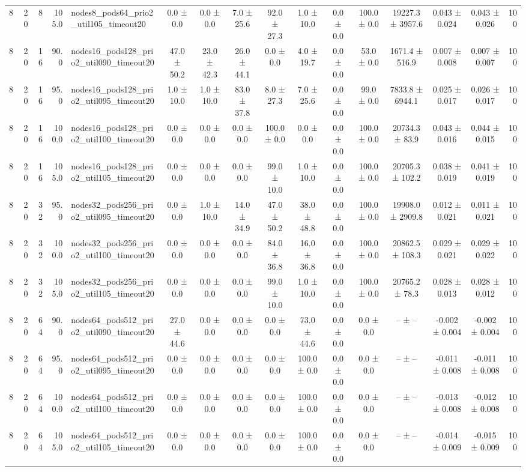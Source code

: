 \begin{tabular}{r r r r l c c c c c c c c c c r}
8 & 20 & 8 & 105.0 & nodes8\_pods64\_prio2\_util105\_timeout20 & 0.0 ± 0.0 & 0.0 ± 0.0 & 7.0 ± 25.6 & 92.0 ± 27.3 & 1.0 ± 10.0 & 0.0 ± 0.0 & 100.0 ± 0.0 & 19227.3 ± 3957.6 & 0.043 ± 0.024 & 0.043 ± 0.026 & 100 \\
8 & 20 & 16 & 90.0 & nodes16\_pods128\_prio2\_util090\_timeout20 & 47.0 ± 50.2 & 23.0 ± 42.3 & 26.0 ± 44.1 & 0.0 ± 0.0 & 4.0 ± 19.7 & 0.0 ± 0.0 & 53.0 ± 0.0 & 1671.4 ± 516.9 & 0.007 ± 0.008 & 0.007 ± 0.007 & 100 \\
8 & 20 & 16 & 95.0 & nodes16\_pods128\_prio2\_util095\_timeout20 & 1.0 ± 10.0 & 1.0 ± 10.0 & 83.0 ± 37.8 & 8.0 ± 27.3 & 7.0 ± 25.6 & 0.0 ± 0.0 & 99.0 ± 0.0 & 7833.8 ± 6944.1 & 0.025 ± 0.017 & 0.026 ± 0.017 & 100 \\
8 & 20 & 16 & 100.0 & nodes16\_pods128\_prio2\_util100\_timeout20 & 0.0 ± 0.0 & 0.0 ± 0.0 & 0.0 ± 0.0 & 100.0 ± 0.0 & 0.0 ± 0.0 & 0.0 ± 0.0 & 100.0 ± 0.0 & 20734.3 ± 83.9 & 0.043 ± 0.016 & 0.044 ± 0.015 & 100 \\
8 & 20 & 16 & 105.0 & nodes16\_pods128\_prio2\_util105\_timeout20 & 0.0 ± 0.0 & 0.0 ± 0.0 & 0.0 ± 0.0 & 99.0 ± 10.0 & 1.0 ± 10.0 & 0.0 ± 0.0 & 100.0 ± 0.0 & 20705.3 ± 102.2 & 0.038 ± 0.019 & 0.041 ± 0.019 & 100 \\
8 & 20 & 32 & 95.0 & nodes32\_pods256\_prio2\_util095\_timeout20 & 0.0 ± 0.0 & 1.0 ± 10.0 & 14.0 ± 34.9 & 47.0 ± 50.2 & 38.0 ± 48.8 & 0.0 ± 0.0 & 100.0 ± 0.0 & 19908.0 ± 2909.8 & 0.012 ± 0.021 & 0.011 ± 0.021 & 100 \\
8 & 20 & 32 & 100.0 & nodes32\_pods256\_prio2\_util100\_timeout20 & 0.0 ± 0.0 & 0.0 ± 0.0 & 0.0 ± 0.0 & 84.0 ± 36.8 & 16.0 ± 36.8 & 0.0 ± 0.0 & 100.0 ± 0.0 & 20862.5 ± 108.3 & 0.029 ± 0.021 & 0.029 ± 0.022 & 100 \\
8 & 20 & 32 & 105.0 & nodes32\_pods256\_prio2\_util105\_timeout20 & 0.0 ± 0.0 & 0.0 ± 0.0 & 0.0 ± 0.0 & 99.0 ± 10.0 & 1.0 ± 10.0 & 0.0 ± 0.0 & 100.0 ± 0.0 & 20765.2 ± 78.3 & 0.028 ± 0.013 & 0.028 ± 0.012 & 100 \\
8 & 20 & 64 & 90.0 & nodes64\_pods512\_prio2\_util090\_timeout20 & 27.0 ± 44.6 & 0.0 ± 0.0 & 0.0 ± 0.0 & 0.0 ± 0.0 & 73.0 ± 44.6 & 0.0 ± 0.0 & 0.0 ± 0.0 & -- ± -- & -0.002 ± 0.004 & -0.002 ± 0.004 & 100 \\
8 & 20 & 64 & 95.0 & nodes64\_pods512\_prio2\_util095\_timeout20 & 0.0 ± 0.0 & 0.0 ± 0.0 & 0.0 ± 0.0 & 0.0 ± 0.0 & 100.0 ± 0.0 & 0.0 ± 0.0 & 0.0 ± 0.0 & -- ± -- & -0.011 ± 0.008 & -0.011 ± 0.008 & 100 \\
8 & 20 & 64 & 100.0 & nodes64\_pods512\_prio2\_util100\_timeout20 & 0.0 ± 0.0 & 0.0 ± 0.0 & 0.0 ± 0.0 & 0.0 ± 0.0 & 100.0 ± 0.0 & 0.0 ± 0.0 & 0.0 ± 0.0 & -- ± -- & -0.013 ± 0.008 & -0.012 ± 0.008 & 100 \\
8 & 20 & 64 & 105.0 & nodes64\_pods512\_prio2\_util105\_timeout20 & 0.0 ± 0.0 & 0.0 ± 0.0 & 0.0 ± 0.0 & 0.0 ± 0.0 & 100.0 ± 0.0 & 0.0 ± 0.0 & 0.0 ± 0.0 & -- ± -- & -0.014 ± 0.009 & -0.015 ± 0.009 & 100 \\
\bottomrule
\end{tabular}
